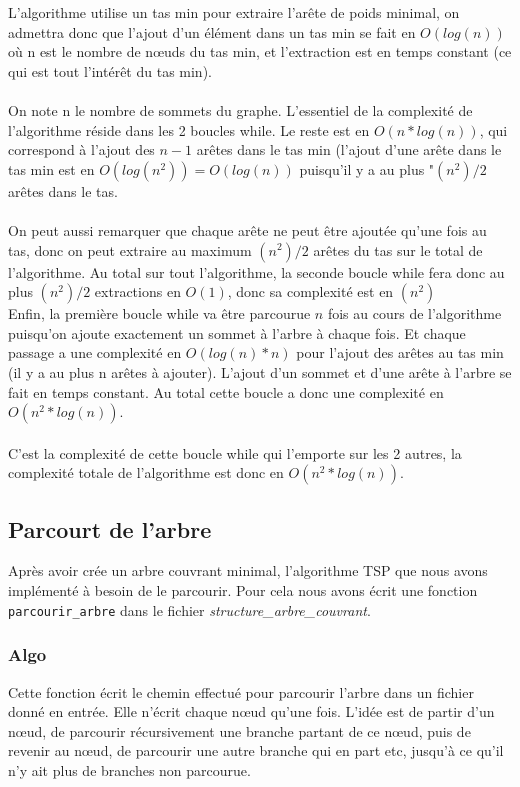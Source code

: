 \documentclass[a4paper,11pt]{article}
\begin{document}
L'algorithme utilise un tas min pour extraire l'arête de poids minimal, on admettra donc que l'ajout d'un élément dans un tas min se fait en $O(log(n))$ où n est le nombre de nœuds du tas min, et l'extraction est en temps constant (ce qui est tout l'intérêt du tas min).\\
\\
On note n le nombre de sommets du graphe. L'essentiel de la complexité de l'algorithme réside dans les 2 boucles while. Le reste est en $O(n*log(n))$, qui correspond à l'ajout des $n-1$ arêtes dans le tas min (l'ajout d'une arête dans le tas min est en $O(log(n^2)) = O(log(n))$ puisqu'il y a au plus "$(n^2)/2$ arêtes dans le tas.\\
\\
On peut aussi remarquer que chaque arête ne peut être ajoutée qu'une fois au tas, donc on peut extraire au maximum $(n^2)/2$ arêtes du tas sur le total de l'algorithme. Au total sur tout l'algorithme, la seconde boucle while fera donc au plus $(n^2)/2$ extractions en $O(1)$, donc sa complexité est en $(n^2)$\\
Enfin, la première boucle while va être parcourue $n$ fois au cours de l'algorithme puisqu'on ajoute exactement un sommet à l'arbre à chaque fois. Et chaque passage a une complexité en $O(log(n)*n)$ pour l'ajout des arêtes au tas min (il y a au plus n arêtes à ajouter). L'ajout d'un sommet et d'une arête à l'arbre se fait en temps constant. Au total cette boucle a donc une complexité en $O(n^2*log(n))$.\\
\\
C'est la complexité de cette boucle while qui l'emporte sur les 2 autres, la complexité totale de l'algorithme est donc en $O(n^2*log(n))$.


\subsection{Parcourt de l'arbre} %

Après avoir crée un arbre couvrant minimal, l'algorithme TSP que nous avons implémenté à besoin de le parcourir. Pour cela nous avons écrit une fonction \texttt{parcourir\_arbre} dans le fichier \textit{structure\_arbre\_couvrant}.

\subsubsection*{Algo}
Cette fonction écrit le chemin effectué pour parcourir l'arbre dans un fichier donné en entrée. Elle n'écrit chaque nœud qu'une fois. L'idée est de partir d'un nœud, de parcourir récursivement une branche partant de ce nœud, puis de revenir au nœud, de parcourir une autre branche qui en part etc, jusqu'à ce qu'il n'y ait plus de branches non parcourue.
\end{document}

